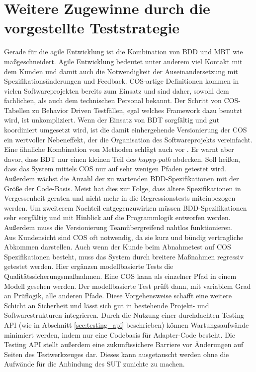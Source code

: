\section{Weitere Zugewinne durch die vorgestellte Teststrategie}
Gerade für die agile Entwicklung ist die Kombination von BDD und \Gls{MBT} wie maßgeschneidert. Agile Entwicklung bedeutet unter anderem viel Kontakt mit dem Kunden und damit auch die Notwendigkeit der Auseinandersetzung mit Spezifikationsänderungen und Feedback. \Gls{COS}-artige Definitionen kommen in vielen Softwareprojekten bereits zum Einsatz und sind daher, sowohl dem fachlichen, als auch dem technischen Personal bekannt. Der Schritt von \Gls{COS}-Tabellen zu Behavior Driven Testfällen, egal welches Framework dazu benutzt wird, ist unkompliziert. Wenn der Einsatz von \Gls{BDT} sorgfältig und gut koordiniert umgesetzt wird, ist die damit einhergehende Versionierung der \Gls{COS} ein wertvoller Nebeneffekt, der die Organisation des Softwareprojekts vereinfacht.\\
Eine ähnliche Kombination von Methoden schlägt auch \citeauthor{binder_model-based_2014} vor \cite{binder_model-based_2014}. Er warnt aber davor, dass \Gls{BDT} nur einen kleinen Teil des \textit{happy-path} abdecken. Soll heißen, dass das System mittels \Gls{COS} nur auf sehr wenigen Pfaden getestet wird. Außerdem wächst die Anzahl der zu wartenden \Gls{BDD}-Spezifikationen mit der Größe der Code-Basis. Meist hat dies zur Folge, dass ältere Spezifikationen in Vergessenheit geraten und nicht mehr in die Regressionstests miteinbezogen werden. Um zweiterem Nachteil entgegenzuwirken müssen \Gls{BDD}-Spezifikationen sehr sorgfältig und mit Hinblick auf die Programmlogik entworfen werden. Außerdem muss die Versionierung Teamübergreifend nahtlos funktionieren.\\
Aus Kundensicht sind \Gls{COS} oft notwendig, da sie kurz und bündig vertragliche Abkommen darstellen. Auch wenn der Kunde beim Abnahmetest auf \Gls{COS} Spezifikationen besteht, muss das System durch breitere Maßnahmen regressiv getestet werden. Hier ergänzen modellbasierte Tests die Qualitätssicherungsmaßnahmen. Eine \Gls{COS} kann als einzelner Pfad in einem Modell gesehen werden. Der modellbasierte Test prüft dann, mit variablem Grad an Prüflogik, alle anderen Pfade. Diese Vorgehensweise schafft eine weitere Schicht an Sicherheit und lässt sich gut in bestehende Projekt- und Softwarestrukturen integrieren. Durch die Nutzung einer durchdachten Testing API (wie in Abschnitt \ref{sec:testing_api} beschrieben) können Wartungsaufwände minimiert werden, indem nur eine Codebasis für Adapter-Code besteht. Die Testing API stellt außerdem eine zukunftssichere Barriere vor Änderungen auf Seiten des Testwerkzeuges dar. Dieses kann ausgetauscht werden ohne die Aufwände für die Anbindung des \Gls{SUT} zunichte zu machen.\\
